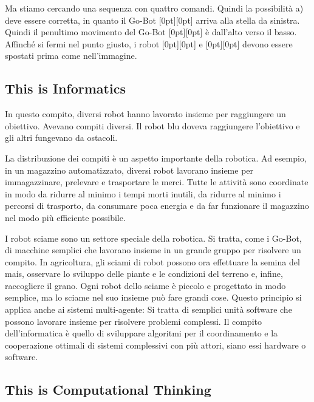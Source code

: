 \documentclass[a4paper,11pt]{report}
\newcommand{\taskGraphicsFolder}{..}
\begin{document}
Ma stiamo cercando una sequenza con quattro comandi. Quindi la possibilità a) deve essere corretta, in quanto il Go-Bot \raisebox{-0.5ex}[0pt][0pt]{} arriva alla stella da sinistra. Quindi il penultimo movimento del Go-Bot \raisebox{-0.5ex}[0pt][0pt]{} è dall’alto verso il basso. Affinché si fermi nel punto giusto, i robot \raisebox{-0.5ex}[0pt][0pt]{} e \raisebox{-0.5ex}[0pt][0pt]{} devono essere spostati prima come nell’immagine.


\subsection*{This is Informatics}

In questo compito, diversi robot hanno lavorato insieme per raggiungere un obiettivo. Avevano compiti diversi. Il robot blu doveva raggiungere l’obiettivo e gli altri fungevano da ostacoli.

La distribuzione dei compiti è un aspetto importante della robotica. Ad esempio, in un magazzino automatizzato, diversi robot lavorano insieme per immagazzinare, prelevare e trasportare le merci. Tutte le attività sono coordinate in modo da ridurre al minimo i tempi morti inutili, da ridurre al minimo i percorsi di trasporto, da consumare poca energia e da far funzionare il magazzino nel modo più efficiente possibile.

I robot sciame sono un settore speciale della robotica. Si tratta, come i Go-Bot, di macchine semplici che lavorano insieme in un grande gruppo per risolvere un compito. In agricoltura, gli sciami di robot possono ora effettuare la semina del mais, osservare lo sviluppo delle piante e le condizioni del terreno e, infine, raccogliere il grano. Ogni robot dello sciame è piccolo e progettato in modo semplice, ma lo sciame nel suo insieme può fare grandi cose. Questo principio si applica anche ai sistemi multi-agente: Si tratta di semplici unità software che possono lavorare insieme per risolvere problemi complessi. Il compito dell’informatica è quello di sviluppare algoritmi per il coordinamento e la cooperazione ottimali di sistemi complessivi con più attori, siano essi hardware o software.


\subsection*{This is Computational Thinking}
\end{document}
